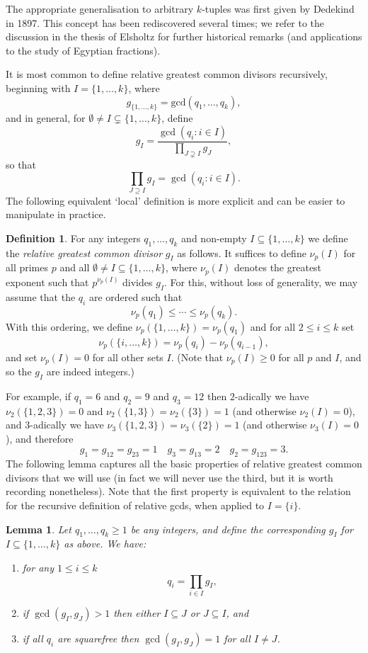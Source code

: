 \documentclass[11pt,letterpaper]{amsart}
\newcommand{\ogcd}[2]{\gcd(#1,#2)}
\newtheorem{lemma}{Lemma}
\theoremstyle{definition}
\newtheorem{definition}{Definition}
\begin{document}
The appropriate generalisation to arbitrary $k$-tuples was first given by Dedekind \cite{Dede} in 1897. This concept has been rediscovered several times; we refer to the discussion in the thesis of Elsholtz \cite{El} for further historical remarks (and applications to the study of Egyptian fractions).

It is most common to define relative greatest common divisors recursively, beginning with $I=\{1,\ldots,k\}$, where
\[g_{\{1,\ldots,k\}} = \mathrm{gcd}(q_1,\ldots,q_k),\]
and in general, for $\emptyset \neq I \subsetneq \{1,\ldots,k\}$, define
\[g_I = \frac{\gcd(q_i : i\in I)}{\prod_{J\supsetneq I}g_J},\]
so that
\[\prod_{J \supseteq I} g_I = \gcd(q_i:i \in I).\]
The following equivalent `local' definition is more explicit and can be easier to manipulate in practice.
\begin{definition}
For any integers $q_1,\ldots,q_k$ and non-empty $I\subseteq \{1,\ldots,k\}$ we define the \emph{relative greatest common divisor} $g_I$ as follows. It suffices to define $\nu_p(I)$ for all primes $p$ and all $\emptyset\neq I\subseteq \{1,\ldots,k\}$, where $\nu_p(I)$ denotes the greatest exponent such that $p^{\nu_p(I)}$ divides $g_I$. For this, without loss of generality, we may assume that the $q_i$ are ordered such that 
\[\nu_p(q_1)\leq \cdots \leq \nu_p(q_k).\]
With this ordering, we define $\nu_p(\{1,\ldots,k\})=\nu_p(q_1)$ and for all $2\leq i\leq k$ set
\[\nu_p(\{i,\ldots,k\})=\nu_p(q_i)-\nu_p(q_{i-1}),\]
and set $\nu_p(I) = 0$ for all other sets $I$. (Note that $\nu_p(I)\geq 0$ for all $p$ and $I$, and so the $g_I$ are indeed integers.)
\end{definition}
For example, if $q_1=6$ and $q_2=9$ and $q_3=12$ then $2$-adically we have $\nu_2(\{1,2,3\})=0$ and $\nu_2(\{1,3\})=\nu_2(\{3\})=1$ (and otherwise $\nu_2(I)=0$), and $3$-adically we have $\nu_3(\{1,2,3\})=\nu_3(\{2\})=1$ (and otherwise $\nu_3(I)=0$), and therefore
\[g_1=g_{12}=g_{23}=1\quad g_3=g_{13}=2\quad g_2=g_{123}=3.\]
The following lemma captures all the basic properties of relative greatest common divisors that we will use (in fact we will never use the third, but it is worth recording nonetheless). Note that the first property is equivalent to the relation for the recursive definition of relative gcds, when applied to $I = \{i\}$.
\begin{lemma}
Let $q_1,\ldots,q_k\geq 1$ be any integers, and define the corresponding $g_I$ for $I\subseteq \{1,\ldots,k\}$ as above. We have:
\begin{enumerate}
\item for any $1\leq i\leq k$
\[q_i=\prod_{i\in I}g_I,\]
\item if $\ogcd{g_I}{g_J}>1$ then either $I\subseteq J$ or $J\subseteq I$, and 
\item if all $q_i$ are squarefree then $\ogcd{g_I}{g_J}=1$ for all $I\neq J$.
\end{enumerate}
\end{lemma} 
\end{document}
